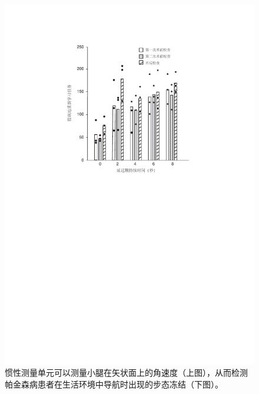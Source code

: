 \begin{figure}[!htb]
	\centering
	\includegraphics[width=1.0\linewidth]{chap7/7_4}
	\caption{惯性测量单元可以测量小腿在矢状面上的角速度（上图），从而检测帕金森病患者在生活环境中导航时出现的步态冻结（下图）\cite{o2020turning}。 \label{fig:7_4}}
\end{figure}


